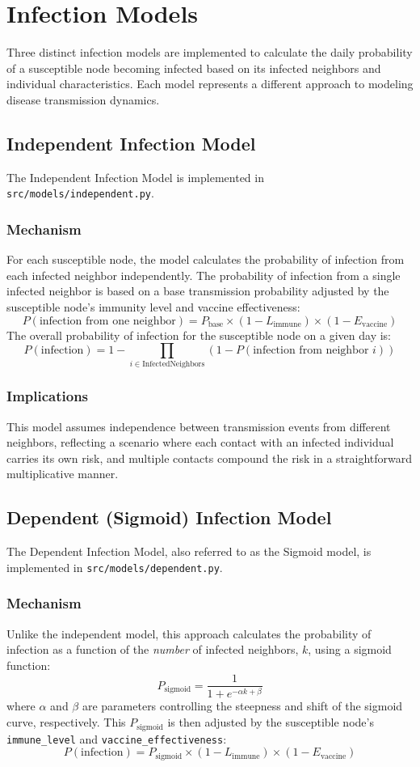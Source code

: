 \documentclass[12pt]{article}
\begin{document}
\section{Infection Models}
Three distinct infection models are implemented to calculate the daily probability of a susceptible node becoming infected based on its infected neighbors and individual characteristics. Each model represents a different approach to modeling disease transmission dynamics.

\subsection{Independent Infection Model}
The Independent Infection Model is implemented in \texttt{src/models/independent.py}.
\subsubsection{Mechanism}
For each susceptible node, the model calculates the probability of infection from each infected neighbor independently. The probability of infection from a single infected neighbor is based on a base transmission probability adjusted by the susceptible node's immunity level and vaccine effectiveness:
\[ P(\text{infection from one neighbor}) = P_{\text{base}} \times (1 - L_{\text{immune}}) \times (1 - E_{\text{vaccine}}) \]
The overall probability of infection for the susceptible node on a given day is:
\[ P(\text{infection}) = 1 - \prod_{i \in \text{InfectedNeighbors}} (1 - P(\text{infection from neighbor } i)) \]
\subsubsection{Implications}
This model assumes independence between transmission events from different neighbors, reflecting a scenario where each contact with an infected individual carries its own risk, and multiple contacts compound the risk in a straightforward multiplicative manner.

\subsection{Dependent (Sigmoid) Infection Model}
The Dependent Infection Model, also referred to as the Sigmoid model, is implemented in \texttt{src/models/dependent.py}.
\subsubsection{Mechanism}
Unlike the independent model, this approach calculates the probability of infection as a function of the \textit{number} of infected neighbors, $k$, using a sigmoid function:
\[ P_{\text{sigmoid}} = \frac{1}{1 + e^{-\alpha k + \beta}} \]
where $\alpha$ and $\beta$ are parameters controlling the steepness and shift of the sigmoid curve, respectively. This $P_{\text{sigmoid}}$ is then adjusted by the susceptible node's \texttt{immune\_level} and \texttt{vaccine\_ef\-fec\-tive\-ness}:
\[ P(\text{infection}) = P_{\text{sigmoid}} \times (1 - L_{\text{immune}}) \times (1 - E_{\text{vaccine}}) \]
\end{document}
